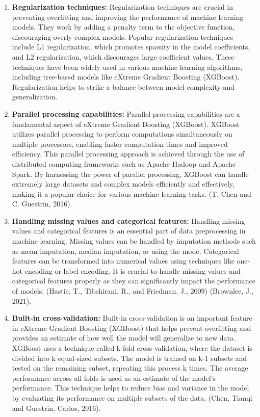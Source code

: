 \documentclass[12pt,oneside]{report}
\begin{document}
\begin{enumerate}
\item \textbf{Regularization techniques:}
Regularization techniques are crucial in preventing overfitting and improving the performance of machine learning models. They work by adding a penalty term to the objective function, discouraging overly complex models. Popular regularization techniques include L1 regularization, which promotes sparsity in the model coefficients, and L2 regularization, which discourages large coefficient values. These techniques have been widely used in various machine learning algorithms, including tree-based models like eXtreme Gradient Boosting (XGBoost). Regularization helps to strike a balance between model complexity and generalization. 

\item \textbf{Parallel processing capabilities:}
Parallel processing capabilities are a fundamental aspect of eXtreme Gradient Boosting (XGBoost). XGBoost utilizes parallel processing to perform computations simultaneously on multiple processors, enabling faster computation times and improved efficiency. This parallel processing approach is achieved through the use of distributed computing frameworks such as Apache Hadoop and Apache Spark. By harnessing the power of parallel processing, XGBoost can handle extremely large datasets and complex models efficiently and effectively, making it a popular choice for various machine learning tasks. (T. Chen and C. Guestrin, 2016).

\item \textbf{Handling missing values and categorical features:}
Handling missing values and categorical features is an essential part of data preprocessing in machine learning. Missing values can be handled by imputation methods such as mean imputation, median imputation, or using the mode. Categorical features can be transformed into numerical values using techniques like one-hot encoding or label encoding. It is crucial to handle missing values and categorical features properly as they can significantly impact the performance of models. (Hastie, T., Tibshirani, R., and Friedman, J., 2009) (Brownlee, J., 2021).

\item \textbf{Built-in cross-validation:}
Built-in cross-validation is an important feature in eXtreme Gradient Boosting (XGBoost) that helps prevent overfitting and provides an estimate of how well the model will generalize to new data. XGBoost uses a technique called k-fold cross-validation, where the dataset is divided into k equal-sized subsets. The model is trained on k-1 subsets and tested on the remaining subset, repeating this process k times. The average performance across all folds is used as an estimate of the model's performance. This technique helps to reduce bias and variance in the model by evaluating its performance on multiple subsets of the data. (Chen, Tianqi and Guestrin, Carlos, 2016).


\end{enumerate}
\end{document}
